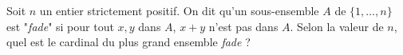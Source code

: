 Soit $n$ un entier strictement positif. On dit qu'un sous-ensemble $A$ de $\{1, \dots, n\}$ est "\textit{fade}" si pour tout $x, y$ dans $A$, $x+y$ n'est pas dans $A$. Selon la valeur de $n$, quel est le cardinal du plus grand ensemble \textit{fade} ?